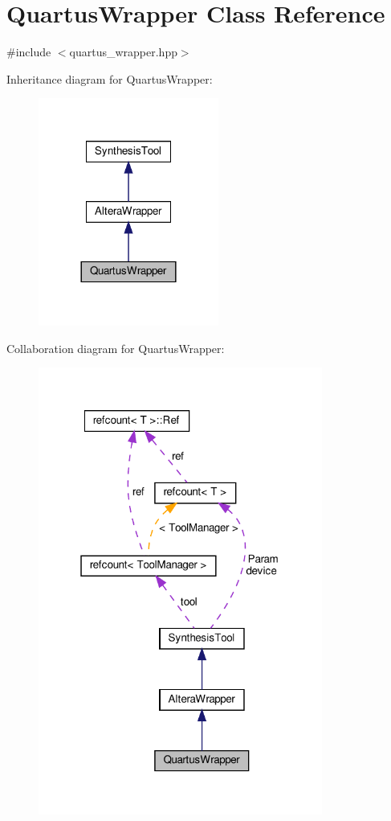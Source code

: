 \hypertarget{classQuartusWrapper}{}\section{Quartus\+Wrapper Class Reference}
\label{classQuartusWrapper}


{\ttfamily \#include $<$quartus\+\_\+wrapper.\+hpp$>$}



Inheritance diagram for Quartus\+Wrapper\+:
\nopagebreak
\begin{figure}[H]
\begin{center}
\leavevmode
\includegraphics[width=168pt]{da/d64/classQuartusWrapper__inherit__graph}
\end{center}
\end{figure}


Collaboration diagram for Quartus\+Wrapper\+:
\nopagebreak
\begin{figure}[H]
\begin{center}
\leavevmode
\includegraphics[width=265pt]{dc/d88/classQuartusWrapper__coll__graph}
\end{center}
\end{figure}
